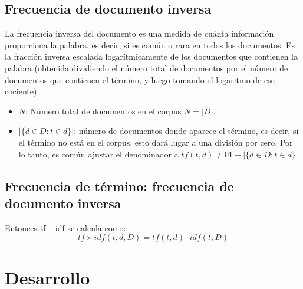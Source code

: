 \documentclass{IEEEtran}
\begin{document}
\subsection{Frecuencia de documento inversa}\label{sec:frec-de-docum}
La frecuencia inversa del documento es una medida de cuánta información
proporciona la palabra, es decir, si es común o rara en todos los documentos.
Es la fracción inversa escalada logarítmicamente de los documentos que
contienen la palabra (obtenida dividiendo el número total de documentos
por el número de documentos que contienen el término, y luego tomando el
logaritmo de ese cociente):
\begin{itemize}
  \item $N$: Número total de documentos en el corpus $N = |D| $.
  \item $|\{d \in D : t \in d\}|$: número de documentos donde aparece el término,
        es decir, si el término no está en el corpus, esto dará lugar a una división por cero. Por lo tanto, es     común ajustar el denominador a $tf(t,d) \ne 01 + |\{d \in D : t \in d \}|$

\end{itemize}

\subsection{Frecuencia de término: frecuencia de documento inversa}\label{sec:frec-de-term-1}
Entonces tf – idf se calcula como:
\[ tf \times idf(t,d,D) = tf(t,d) \cdot idf(t,D)\]

\section{Desarrollo}\label{sec:desarrollo}
\end{document}
